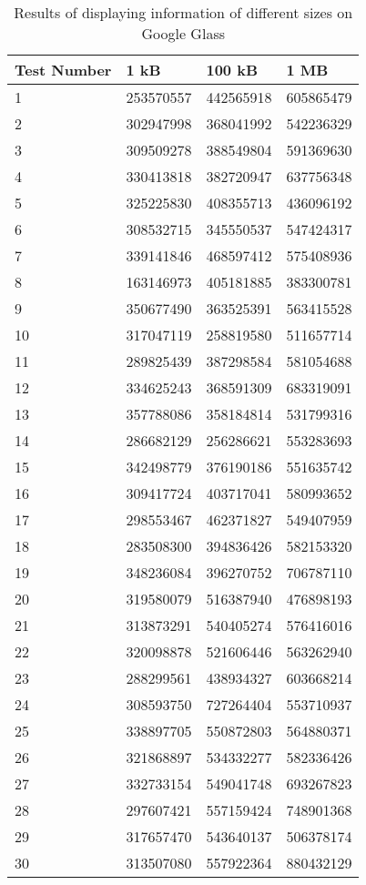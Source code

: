 	\begin{table}[ht!]
    		\caption{Results of displaying information of different sizes on Google Glass} \label{tab:distamceSmartphoneFull}
		\centering \begin{tabularx}{\textwidth}{l|X|X|X} \hline
		\textbf{Test Number} & \textbf{1 kB} & \textbf{100 kB} & \textbf{1 MB} \\ \hline \hline
		
		1&	253570557	&	442565918	&	605865479	\\ \hline
		2&	302947998	&	368041992	&	542236329	\\ \hline
		3&	309509278	&	388549804	&	591369630	\\ \hline
		4&	330413818	&	382720947	&	637756348	\\ \hline
		5&	325225830	&	408355713	&	436096192	\\ \hline
		6&	308532715	&	345550537	&	547424317	\\ \hline
		7&	339141846	&	468597412	&	575408936	\\ \hline
		8&	163146973	&	405181885	&	383300781	\\ \hline
		9&	350677490	&	363525391	&	563415528	\\ \hline
		10&	317047119	&	258819580	&	511657714	\\ \hline
		11&	289825439	&	387298584	&	581054688	\\ \hline
		12&	334625243	&	368591309	&	683319091	\\ \hline
		13&	357788086	&	358184814	&	531799316	\\ \hline
		14&	286682129	&	256286621	&	553283693	\\ \hline
		15&	342498779	&	376190186	&	551635742	\\ \hline
		16&	309417724	&	403717041	&	580993652	\\ \hline
		17&	298553467	&	462371827	&	549407959	\\ \hline
		18&	283508300	&	394836426	&	582153320	\\ \hline
		19&	348236084	&	396270752	&	706787110	\\ \hline
		20&	319580079	&	516387940	&	476898193	\\ \hline
		21&	313873291	&	540405274	&	576416016	\\ \hline
		22&	320098878	&	521606446	&	563262940	\\ \hline
		23&	288299561	&	438934327	&	603668214	\\ \hline
		24&	308593750	&	727264404	&	553710937	\\ \hline
		25&	338897705	&	550872803	&	564880371	\\ \hline
		26&	321868897	&	534332277	&	582336426	\\ \hline
		27&	332733154	&	549041748	&	693267823	\\ \hline
		28&	297607421	&	557159424	&	748901368	\\ \hline
		29&	317657470	&	543640137	&	506378174	\\ \hline
		30&	313507080	&	557922364	&	880432129	\\ \hline
		
		\end{tabularx}
	\end{table}

